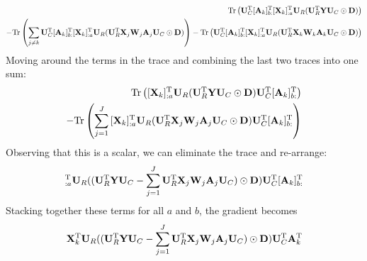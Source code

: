 \documentclass{article}
\newcommand{\B}[1]{{\bf{#1}}}
\newcommand\tr{\mathrm{Tr}}
\newcommand{\Ykron}{\B{U}_R^\T\B{Y}\B{U}_C}
\newcommand{\XWAkron}[1]{\B{U}_R^\T\B{X}_{#1}\B{W}_{#1}\B{A}_{#1}\B{U}_C}
\begin{document}
\begin{eqnarray}\nonumber
    \tr\left( {\B{U}_C^\T[\B{A}_{k}]_{b:}^{\T}[\B{X}_{k}]_{:a}^{\T}\B{U}_R} (\Ykron \odot \B{D})\right) \\
-\tr\left( \sum_{j\neq k}{\B{U}_C^\T[\B{A}_{k}]_{b:}^{\T}[\B{X}_{k}]_{:a}^{\T}\B{U}_R} (\XWAkron{j} \odot
  \B{D}) \right) 
-\tr\left({\B{U}_C^\T[\B{A}_{k}]_{b:}^{\T}[\B{X}_{k}]_{:a}^{\T}\B{U}_R} (\XWAkron{k} \odot \B{D}) \right)
\end{eqnarray}
Moving around the terms in the trace and combining the last two traces
into one sum:
\begin{eqnarray}\nonumber
    \tr\left( [\B{X}_{k}]_{:a}^{\T}\B{U}_R (\Ykron \odot \B{D}) \B{U}_C^\T[\B{A}_{k}]_{b:}^{\T}\right) \\
-\tr\left( \sum_{j=1}^J{[\B{X}_{k}]_{:a}^{\T}\B{U}_R} (\XWAkron{j} \odot
  \B{D}) \B{U}_C^\T[\B{A}_{k}]_{b:}^{\T}\right) 
\end{eqnarray}
Observing that this is a scalar, we can eliminate the trace and re-arrange:
\begin{eqnarray}
    [\B{X}_{k}]_{:a}^{\T}\B{U}_R ((\Ykron-\sum_{j=1}^J \XWAkron{j}) \odot \B{D}) \B{U}_C^\T[\B{A}_{k}]_{b:}^{\T} \\
\end{eqnarray}
Stacking together these terms for all $a$ and $b$, the gradient becomes
\begin{eqnarray}
    \B{X}_{k}^{\T}\B{U}_R ((\Ykron-\sum_{j=1}^J \XWAkron{j}) \odot \B{D}) \B{U}_C^\T\B{A}_{k}^{\T} \\
\end{eqnarray}

\newpage
\end{document}
